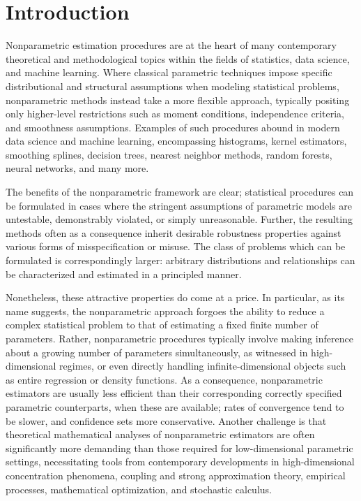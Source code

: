 
\chapter{Introduction}

Nonparametric estimation procedures are at the heart of many contemporary
theoretical and methodological topics within the fields of statistics, data
science, and machine learning. Where classical parametric techniques impose
specific distributional and structural assumptions when modeling statistical
problems, nonparametric methods instead take a more flexible approach,
typically positing only higher-level restrictions such as moment conditions,
independence criteria, and smoothness assumptions. Examples of such procedures
abound in modern data science and machine learning, encompassing histograms,
kernel estimators, smoothing splines, decision trees, nearest neighbor methods,
random forests, neural networks, and many more.

The benefits of the nonparametric framework are clear; statistical procedures
can be formulated in cases where the stringent assumptions of parametric models
are untestable, demonstrably violated, or simply unreasonable.
Further, the resulting
methods often as a consequence inherit desirable robustness properties against
various forms of misspecification or misuse. The class of problems which can be
formulated is correspondingly larger: arbitrary distributions and
relationships can be characterized and estimated in a principled manner.

Nonetheless, these attractive properties do come at a price. In particular, as
its name suggests, the nonparametric approach forgoes the ability to reduce
a complex statistical problem to that of estimating a fixed finite number of
parameters. Rather, nonparametric procedures typically involve making inference
about a growing number of parameters simultaneously, as witnessed in
high-dimensional regimes, or even directly handling infinite-dimensional
objects such as entire regression or density functions. As a consequence,
nonparametric estimators are usually less efficient than their corresponding
correctly specified parametric counterparts, when these are available; rates of
convergence tend to be slower, and confidence sets more conservative. Another
challenge is that theoretical mathematical analyses of nonparametric estimators
are often significantly more demanding than those required for low-dimensional
parametric settings, necessitating tools from contemporary developments in
high-dimensional concentration phenomena, coupling and strong approximation
theory, empirical processes, mathematical optimization, and stochastic
calculus.

